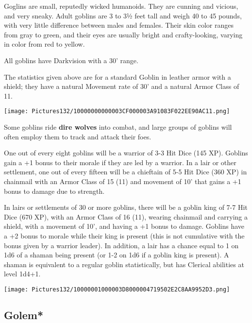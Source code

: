 \documentclass[a4paper,twoside,openany,10pt]{book}
\begin{document}
\begin{multicols}{2}
Goglins are small, reputedly wicked humanoids. They are cunning and vicious, and very sneaky. Adult goblins are 3 to 3½ feet tall and weigh 40 to 45 pounds, with very little difference between males and females. Their skin color ranges from gray to green, and their eyes are usually bright and crafty-looking, varying in color from red to yellow.

All goblins have Darkvision with a 30' range.

The statistics given above are for a standard Goblin in leather armor with a shield; they have a natural Movement rate of 30' and a natural Armor Class of 11.

\begin{center}
	\texttt{[image: Pictures132/10000000000003CF000003A91083F022EE90AC11.png]}
\end{center}

Some goblins ride \textbf{dire wolves} into combat, and large groups of goblins will often employ them to track and attack their foes.

One out of every eight goblins will be a warrior of 3-3 Hit Dice (145 XP). Goblins gain a +1 bonus to their morale if they are led by a warrior. In a lair or other settlement, one out of every fifteen will be a chieftain of 5-5 Hit Dice (360 XP) in chainmail with an Armor Class of 15 (11) and movement of 10' that gains a +1 bonus to damage due to strength. 


In lairs or settlements of 30 or more goblins, there will be a goblin king of 7-7 Hit Dice (670 XP), with an Armor Class of 16 (11), wearing chainmail and carrying a shield, with a movement of 10', and having a +1 bonus to damage. Goblins have a +2 bonus to morale while their king is present (this is not cumulative with the bonus given by a warrior leader). In addition, a lair has a chance equal to 1 on 1d6 of a shaman being present (or 1-2 on 1d6 if a goblin king is present). A shaman is equivalent to a regular goblin statistically, but has Clerical abilities at level 1d4+1.


\begin{center}
	\texttt{[image: Pictures132/10000001000003D8000004719502E2C8AA9952D3.png]}
\end{center}

\columnbreak


\subsection*{Golem*}\label{golem}


\end{multicols}
\end{document}
